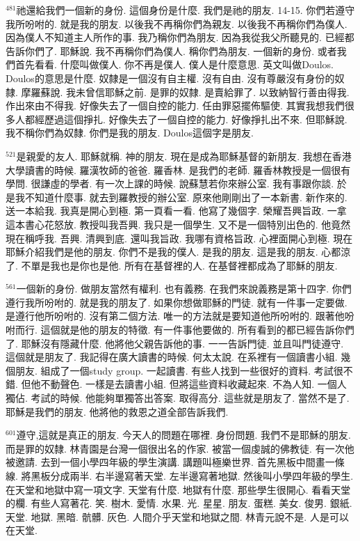 \documentclass{book}
\begin{document}
$^{481}$祂還給我們一個新的身份.
這個身份是什麼.
我們是祂的朋友.
14-15.
你們若遵守我所吩咐的.
就是我的朋友.
以後我不再稱你們為親友.
以後我不再稱你們為僕人.
因為僕人不知道主人所作的事.
我乃稱你們為朋友.
因為我從我父所聽見的.
已經都告訴你們了.
耶穌說.
我不再稱你們為僕人.
稱你們為朋友.
一個新的身份.
或者我們首先看看.
什麼叫做僕人.
你不再是僕人.
僕人是什麼意思.
英文叫做Doulos.
Doulos的意思是什麼.
奴隸是一個沒有自主權.
沒有自由.
沒有尊嚴沒有身份的奴隸.
摩羅蘇說.
我未曾信耶穌之前.
是罪的奴隸.
是賣給罪了.
以致納智行善由得我.
作出來由不得我.
好像失去了一個自控的能力.
任由罪惡擺佈驅使.
其實我想我們很多人都經歷過這個掙扎.
好像失去了一個自控的能力.
好像掙扎出不來.
但耶穌說.
我不稱你們為奴隸.
你們是我的朋友.
Doulos這個字是朋友.

$^{521}$是親愛的友人.
耶穌就稱.
神的朋友.
現在是成為耶穌基督的新朋友.
我想在香港大學讀書的時候.
羅漢牧師的爸爸.
羅香林.
是我們的老師.
羅香林教授是一個很有學問.
很謙虛的學者.
有一次上課的時候.
說蘇慧若你來辦公室.
我有事跟你談.
於是我不知道什麼事.
就去到羅教授的辦公室.
原來他剛剛出了一本新書.
新作來的.
送一本給我.
我真是開心到極.
第一頁看一看.
他寫了幾個字.
榮耀吾興旨政.
一拿這本書心花怒放.
教授叫我吾興.
我只是一個學生.
又不是一個特別出色的.
他竟然現在稱呼我.
吾興.
清興到底.
還叫我旨政.
我哪有資格旨政.
心裡面開心到極.
現在耶穌介紹我們是他的朋友.
你們不是我的僕人.
是我的朋友.
這是我的朋友.
心都涼了.
不單是我也是你也是他.
所有在基督裡的人.
在基督裡都成為了耶穌的朋友.

$^{561}$一個新的身份.
做朋友當然有權利.
也有義務.
在我們來說義務是第十四字.
你們遵行我所吩咐的.
就是我的朋友了.
如果你想做耶穌的門徒.
就有一件事一定要做.
是遵行他所吩咐的.
沒有第二個方法.
唯一的方法就是要知道他所吩咐的.
跟著他吩咐而行.
這個就是他的朋友的特徵.
有一件事他要做的.
所有看到的都已經告訴你們了.
耶穌沒有隱藏什麼.
他將他父親告訴他的事.
一一告訴門徒.
並且叫門徒遵守.
這個就是朋友了.
我記得在廣大讀書的時候.
何太太說.
在系裡有一個讀書小組.
幾個朋友.
組成了一個study group.
一起讀書.
有些人找到一些很好的資料.
考試很不錯.
但他不動聲色.
一樣是去讀書小組.
但將這些資料收藏起來.
不為人知.
一個人獨佔.
考試的時候.
他能夠單獨答出答案.
取得高分.
這些就是朋友了.
當然不是了.
耶穌是我們的朋友.
他將他的救恩之道全部告訴我們.

$^{601}$遵守,這就是真正的朋友.
今天人的問題在哪裡.
身份問題.
我們不是耶穌的朋友.
而是罪的奴隸.
林青園是台灣一個很出名的作家.
被當一個虔誠的佛教徒.
有一次他被邀請.
去到一個小學四年級的學生演講.
講題叫極樂世界.
首先黑板中間畫一條線.
將黑板分成兩半.
右半邊寫著天堂.
左半邊寫著地獄.
然後叫小學四年級的學生.
在天堂和地獄中寫一項文字.
天堂有什麼.
地獄有什麼.
那些學生很開心.
看看天堂的欄.
有些人寫著花.
笑.
樹木.
愛情.
水果.
光.
星星.
朋友.
蛋糕.
美女.
俊男.
銀紙.
天堂.
地獄.
黑暗.
骯髒.
灰色.
人間介乎天堂和地獄之間.
林青元說不是.
人是可以在天堂.
\end{document}
